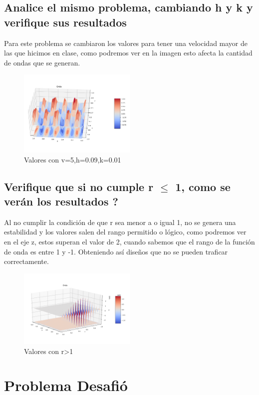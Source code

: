 \documentclass[letterpaper, 12 pt, conference]{ieeeconf}
\begin{document}
\subsection{ Analice el mismo problema, cambiando h y k y verifique sus resultados}
Para este problema se cambiaron los valores para tener una velocidad mayor de las que hicimos en clase, como podremos ver en la imagen esto afecta la cantidad de ondas que se generan.
\begin{figure}[H]
    \centering
    \includegraphics[width=0.5\textwidth]{v 5.png}
    \caption{Valores con v=5,h=0.09,k=0.01}
\end{figure}
\subsection{Verifique que si no cumple r $\leq$ 1, como se verán los resultados ?}
Al no cumplir la condición de que r sea menor a o igual 1, no se genera una estabilidad y los valores salen del rango permitido o lógico, como podremos ver en el eje z, estos superan el valor de 2, cuando sabemos que el rango de la función de onda es entre 1 y -1. Obteniendo así diseños que no se pueden traficar correctamente.
\begin{figure}[H]
    \centering
    \includegraphics[width=0.5\textwidth]{r mayor 1.png}
    \caption{Valores con r>1}
\end{figure}
\section{Problema Desafió}
\end{document}
